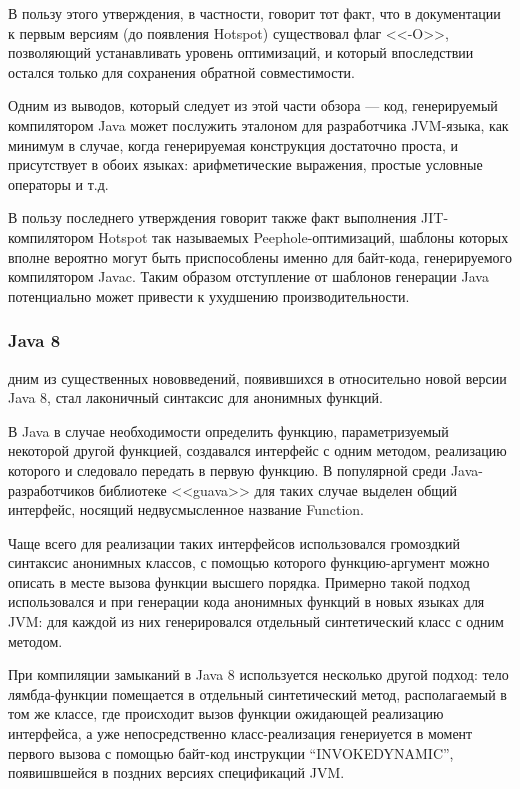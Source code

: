В пользу этого утверждения, в частности, говорит тот факт, что в документации к первым версиям
(до появления Hotspot) существовал флаг
<<-O>>,
позволяющий устанавливать уровень оптимизаций, и который впоследствии остался только для
сохранения обратной совместимости.

Одним из выводов, который следует из этой части обзора --- код, генерируемый компилятором Java
может послужить эталоном для разработчика JVM-языка, как минимум в случае, когда
генерируемая конструкция достаточно проста, и присутствует в обоих языках: арифметические выражения,
простые условные операторы и т.д.

В пользу последнего утверждения говорит также факт выполнения JIT-компилятором Hotspot
так называемых Peephole-оптимизаций\cite{HotSpotDesign}, шаблоны которых вполне вероятно могут быть
приспособлены именно для байт-кода, генерируемого компилятором Javac.
Таким образом отступление от шаблонов генерации Java потенциально может привести к ухудшению
производительности.

\subsubsection{Java 8}
дним из существенных нововведений, появившихся в относительно новой версии Java 8, стал лаконичный
синтаксис для анонимных функций.

В Java в случае необходимости определить функцию, параметризуемый некоторой другой
функцией, создавался интерфейс с одним методом, реализацию которого и следовало передать в первую
функцию.
В популярной среди Java-разработчиков библиотеке <<guava>> для таких случае выделен общий
интерфейс, носящий недвусмысленное название Function.

Чаще всего для реализации таких интерфейсов использовался громоздкий синтаксис анонимных классов,
с помощью которого функцию-аргумент можно описать в месте вызова функции высшего порядка.
Примерно такой подход использовался и при генерации кода анонимных функций в новых языках для JVM:
для каждой из них генерировался отдельный синтетический класс с одним методом.

При компиляции замыканий в Java 8 используется несколько другой подход\cite{J8LambdaTranslation}:
тело лямбда-функции помещается в отдельный синтетический метод, располагаемый в том же классе,
где происходит вызов функции ожидающей реализацию интерфейса, а уже непосредственно класс-реализация
генериуется в момент первого вызова с помощью байт-код инструкции ``INVOKEDYNAMIC'',
появишвшейся в поздних версиях спецификаций JVM.

